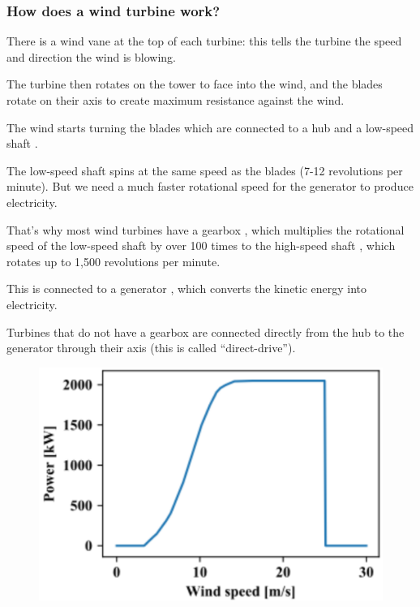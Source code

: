\documentclass{article}
\begin{document}
\phantom{}
\vspace*{-.8cm}
\subsubsection{How does a wind turbine work?}

There is a wind vane  at the top of each turbine: this tells the turbine the speed and direction the wind is blowing.

The turbine then rotates on the tower to face into the wind, and the blades  rotate on their axis to create maximum resistance against the wind.

The wind starts turning the blades which are connected to a hub and a low-speed shaft .

The low-speed shaft spins at the same speed as the blades (7-12 revolutions per minute). But we need a much faster rotational speed for the generator to produce electricity.

That’s why most wind turbines have a gearbox , which multiplies the rotational speed of the low-speed shaft by over 100 times to the high-speed shaft , which rotates up to 1,500 revolutions per minute.

This is connected to a generator , which converts the kinetic energy into electricity.

Turbines that do not have a gearbox are connected directly from the hub to the generator  through their axis (this is called ``direct-drive'').
\wrapfill

\vspace*{1cm}

\setlength{\intextsep}{0pt}%
\begin{figure}
    \includegraphics[width=.45\textwidth]{media/power_curve.png}
    \vspace{-2.7cm}
\end{figure}

\phantom{}
\vspace*{-1.1cm}
\end{document}
